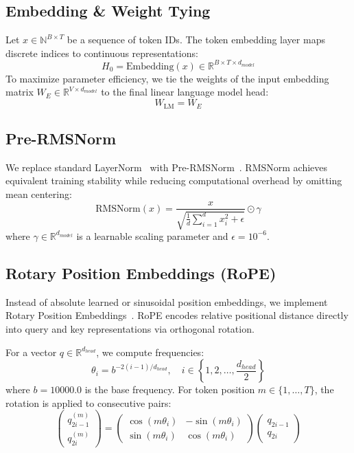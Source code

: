 \documentclass[10pt,twocolumn,letterpaper]{article}
\begin{document}
\subsection{Embedding \& Weight Tying}
Let $x \in \mathbb{N}^{B \times T}$ be a sequence of token IDs. The token embedding layer maps discrete indices to continuous representations:
\begin{equation}
H_0 = \text{Embedding}(x) \in \mathbb{R}^{B \times T \times d_{model}}
\end{equation}
To maximize parameter efficiency, we tie the weights of the input embedding matrix $W_E \in \mathbb{R}^{V \times d_{model}}$ to the final linear language model head:
\begin{equation}
W_{\text{LM}} = W_E
\end{equation}

\subsection{Pre-RMSNorm}
We replace standard LayerNorm~\cite{ba2016layer} with Pre-RMSNorm~\cite{zhang2019root}. RMSNorm achieves equivalent training stability while reducing computational overhead by omitting mean centering:
\begin{equation}
\text{RMSNorm}(x) = \frac{x}{\sqrt{\frac{1}{d}\sum_{i=1}^d x_i^2 + \epsilon}} \odot \gamma
\end{equation}
where $\gamma \in \mathbb{R}^{d_{model}}$ is a learnable scaling parameter and $\epsilon = 10^{-6}$.

\subsection{Rotary Position Embeddings (RoPE)}
Instead of absolute learned or sinusoidal position embeddings, we implement Rotary Position Embeddings~\cite{su2024roformer}. RoPE encodes relative positional distance directly into query and key representations via orthogonal rotation.

For a vector $q \in \mathbb{R}^{d_{head}}$, we compute frequencies:
\begin{equation}
\theta_i = b^{-2(i-1)/d_{head}}, \quad i \in \left\{1, 2, \dots, \frac{d_{head}}{2}\right\}
\end{equation}
where $b = 10000.0$ is the base frequency. For token position $m \in \{1, \dots, T\}$, the rotation is applied to consecutive pairs:
\begin{equation}
\begin{pmatrix} q_{2i-1}^{(m)} \\ q_{2i}^{(m)} \end{pmatrix} = \begin{pmatrix} \cos(m\theta_i) & -\sin(m\theta_i) \\ \sin(m\theta_i) & \cos(m\theta_i) \end{pmatrix} \begin{pmatrix} q_{2i-1} \\ q_{2i} \end{pmatrix}
\end{equation}
\end{document}
